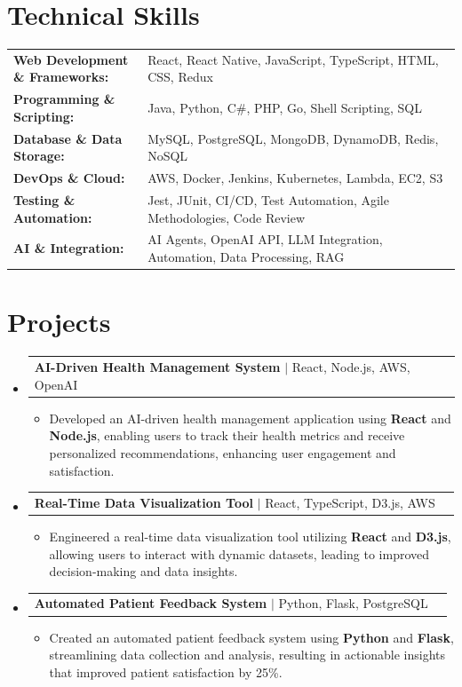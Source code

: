 \documentclass[letterpaper,10pt]{article}
\makeatletter
\newcommand{\resumeItem}[1]{
  \item{\fontsize{8pt}{9pt}\selectfont
    #1 \vspace{-3pt}
  }
}
\newcommand{\resumeProjectHeading}[2]{
    \item
    \begin{tabular*}{1.001\textwidth}{l@{\extracolsep{\fill}}r}
      \fontsize{8.5pt}{10pt}#1 & \textbf{\fontsize{8.5pt}{10pt} #2}\\
    \end{tabular*}\vspace{-7pt}
}
\newcommand{\resumeSubHeadingListStart}{\begin{itemize}[leftmargin=0pt, label={}]}
\newcommand{\resumeSubHeadingListEnd}{\end{itemize}}
\newcommand{\resumeItemListStart}{\begin{itemize}[leftmargin=*]}
\newcommand{\resumeItemListEnd}{\end{itemize}\vspace{-5pt}}
\makeatother
\begin{document}
\section{Technical Skills}
        \vspace{-14pt}
        \begin{table}[h]
            \fontsize{8pt}{9pt}\selectfont
            \begin{tabular}{p{0.3\linewidth} p{0.7\linewidth}}
                \textbf{Web Development \& Frameworks:} & React, React Native, JavaScript, TypeScript, HTML, CSS, Redux \\
                \textbf{Programming \& Scripting:} & Java, Python, C\#, PHP, Go, Shell Scripting, SQL \\
                \textbf{Database \& Data Storage:} & MySQL, PostgreSQL, MongoDB, DynamoDB, Redis, NoSQL \\
                \textbf{DevOps \& Cloud:} & AWS, Docker, Jenkins, Kubernetes, Lambda, EC2, S3 \\
                \textbf{Testing \& Automation:} & Jest, JUnit, CI/CD, Test Automation, Agile Methodologies, Code Review \\
                \textbf{AI \& Integration:} & AI Agents, OpenAI API, LLM Integration, Automation, Data Processing, RAG \\
            \end{tabular}
        \end{table}
 \vspace{-18pt}

\section{Projects}
    \vspace{-5pt}
    \resumeSubHeadingListStart
          \resumeProjectHeading
            {\textbf{AI-Driven Health Management System} $|$ React, Node.js, AWS, OpenAI}{}
            \resumeItemListStart
                \resumeItem{Developed an AI-driven health management application using \textbf{React} and \textbf{Node.js}, enabling users to track their health metrics and receive personalized recommendations, enhancing user engagement and satisfaction.}
            \resumeItemListEnd
        \vspace{-12pt}
    
        \resumeProjectHeading
            {\textbf{Real-Time Data Visualization Tool} $|$ React, TypeScript, D3.js, AWS}{}
        \resumeItemListStart
                \resumeItem{Engineered a real-time data visualization tool utilizing \textbf{React} and \textbf{D3.js}, allowing users to interact with dynamic datasets, leading to improved decision-making and data insights.}
        \resumeItemListEnd
      \vspace{-12pt}
      \resumeProjectHeading
        {\textbf{Automated Patient Feedback System} $|$ Python, Flask, PostgreSQL}{}
    \resumeItemListStart
            \resumeItem{Created an automated patient feedback system using \textbf{Python} and \textbf{Flask}, streamlining data collection and analysis, resulting in actionable insights that improved patient satisfaction by 25\%.}
    \resumeItemListEnd
    \resumeSubHeadingListEnd
\end{document}
